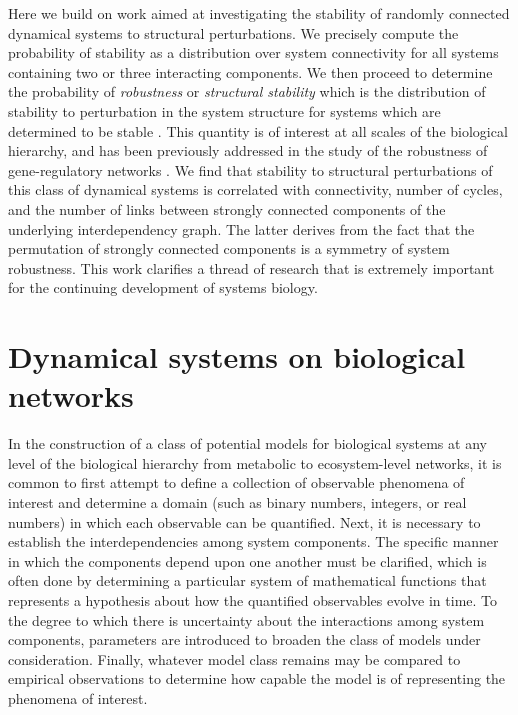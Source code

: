 Here we build on work aimed at investigating the stability of randomly connected dynamical systems to structural perturbations. We precisely compute the probability of stability as a distribution over system connectivity for all systems containing two or three interacting components. We then proceed to determine the probability of \emph{robustness} or \emph{structural stability} which is the distribution of stability to perturbation in the system structure for systems which are determined to be stable \cite{Smale1967}. This quantity is of interest at all scales of the biological hierarchy, and has been previously addressed in the study of the robustness of gene-regulatory networks \cite{WADDINGTON1942a,VanNimwegen1999,Siegal2002,Ciliberti2007b,Ciliberti2007,Wagner2013}. We find that stability to structural perturbations of this class of dynamical systems is correlated with connectivity, number of cycles, and the number of links between strongly connected components of the underlying interdependency graph. The latter derives from the fact that the permutation of strongly connected components is a symmetry of system robustness. This work clarifies a thread of research that is extremely important for the continuing development of systems biology.

\section{Dynamical systems on biological networks}
In the construction of a class of potential models for biological systems at any level of the biological hierarchy from metabolic to ecosystem-level networks, it is common to first attempt to define a collection of observable phenomena of interest and determine a domain (such as binary numbers, integers, or real numbers) in which each observable can be quantified. Next, it is necessary to establish the interdependencies among system components. The specific manner in which the components depend upon one another must be clarified, which is often done by determining a particular system of mathematical functions that represents a hypothesis about how the quantified observables evolve in time. To the degree to which there is uncertainty about the interactions among system components, parameters are introduced to broaden the class of models under consideration. Finally, whatever model class remains may be compared to empirical observations to determine how capable the model is of representing the phenomena of interest.

